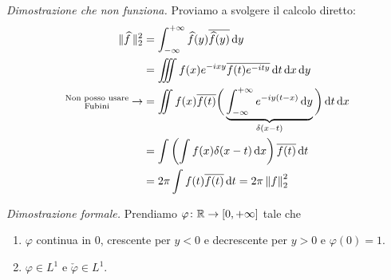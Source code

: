 \textit{Dimostrazione che non funziona.} Proviamo a svolgere il calcolo diretto:
$$
\begin{aligned}
	\|\widehat f\,\|_2^2 
	& = \int_{-\infty}^{+\infty} \widehat f(y) \overline{\widehat f(y)} \,\mathrm{d} y \\
	& = \iiint f(x) e^{-ixy} \overline{f(t) e^{-ity}} \,\mathrm{d} t \,\mathrm{d} x \,\mathrm{d} y \\
	\substack{\text{Non posso usare} \\ \text{Fubini}} \to & = \iint f(x) \overline{f(t)} \bigg( \underbrace{\int_{-\infty}^{+\infty} e^{-iy(t-x)} \,\mathrm{d} y}_{\delta(x-t)} \bigg) \,\mathrm{d} t \,\mathrm{d} x \\
	& = \int \left( \int f(x) \delta(x - t) \,\mathrm{d} x \right) \overline{f(t)} \,\mathrm{d} t \\
	& = 2\pi \int f(t) \overline{f(t)} \,\mathrm{d} t = 2\pi \left\lVert f \right\rVert_2^2
\end{aligned}
$$

\textit{Dimostrazione formale.} Prendiamo $\varphi \colon \mathbb R \to [0,+\infty]$ tale che
\begin{enumerate}
	\item $\varphi$ continua in $0$, crescente per $y < 0$ e decrescente per $y > 0$ e $\varphi(0) = 1$.
	\item $\varphi \in L^1$ e $\check\varphi \in L^1$.
\end{enumerate}

\vss

